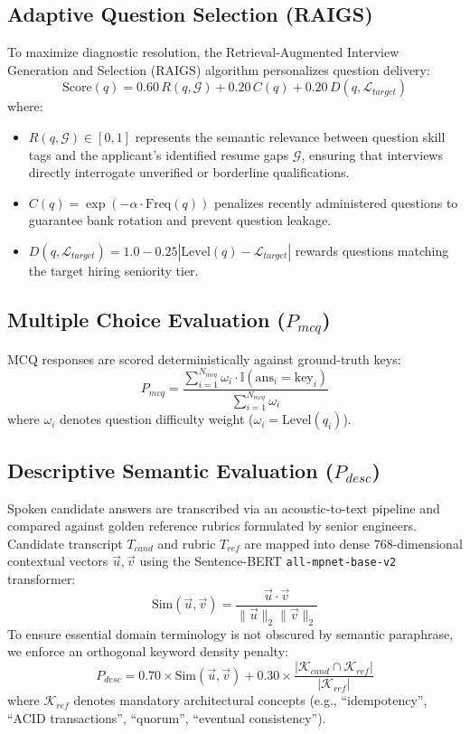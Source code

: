 \documentclass[conference]{IEEEtran}
\begin{document}
\subsection{Adaptive Question Selection (RAIGS)}
To maximize diagnostic resolution, the Retrieval-Augmented Interview Generation and Selection (RAIGS) algorithm personalizes question delivery:
\begin{equation}
\text{Score}(q) = 0.60\,R(q, \mathcal{G}) + 0.20\,C(q) + 0.20\,D(q, \mathcal{L}_{target})
\end{equation}
where:
\begin{itemize}
    \item $R(q, \mathcal{G}) \in [0, 1]$ represents the semantic relevance between question skill tags and the applicant's identified resume gaps $\mathcal{G}$, ensuring that interviews directly interrogate unverified or borderline qualifications.
    \item $C(q) = \exp(-\alpha \cdot \text{Freq}(q))$ penalizes recently administered questions to guarantee bank rotation and prevent question leakage.
    \item $D(q, \mathcal{L}_{target}) = 1.0 - 0.25 |\text{Level}(q) - \mathcal{L}_{target}|$ rewards questions matching the target hiring seniority tier.
\end{itemize}

\subsection{Multiple Choice Evaluation ($P_{mcq}$)}
MCQ responses are scored deterministically against ground-truth keys:
\begin{equation}
P_{mcq} = \frac{\sum_{i=1}^{N_{mcq}} \omega_i \cdot \mathbb{I}(\text{ans}_i = \text{key}_i)}{\sum_{i=1}^{N_{mcq}} \omega_i}
\end{equation}
where $\omega_i$ denotes question difficulty weight ($\omega_i = \text{Level}(q_i)$).

\subsection{Descriptive Semantic Evaluation ($P_{desc}$)}
Spoken candidate answers are transcribed via an acoustic-to-text pipeline and compared against golden reference rubrics formulated by senior engineers. Candidate transcript $T_{cand}$ and rubric $T_{ref}$ are mapped into dense 768-dimensional contextual vectors $\vec{u}, \vec{v}$ using the Sentence-BERT \texttt{all-mpnet-base-v2} transformer:
\begin{equation}
\text{Sim}(\vec{u}, \vec{v}) = \frac{\vec{u} \cdot \vec{v}}{\|\vec{u}\|_2 \|\vec{v}\|_2}
\end{equation}
To ensure essential domain terminology is not obscured by semantic paraphrase, we enforce an orthogonal keyword density penalty:
\begin{equation}
P_{desc} = 0.70 \times \text{Sim}(\vec{u}, \vec{v}) + 0.30 \times \frac{|\mathcal{K}_{cand} \cap \mathcal{K}_{ref}|}{|\mathcal{K}_{ref}|}
\end{equation}
where $\mathcal{K}_{ref}$ denotes mandatory architectural concepts (e.g., ``idempotency'', ``ACID transactions'', ``quorum'', ``eventual consistency'').
\end{document}
